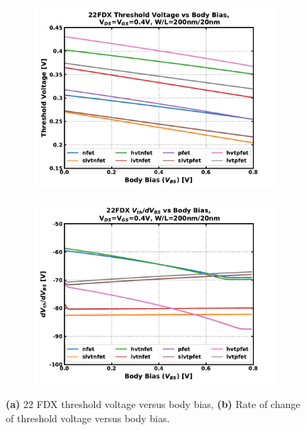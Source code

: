 		\begin{figure}[htb!]
		    \centering
		    \begin{subfigure}{0.5\textwidth}
		        \centering
		        \includegraphics[width=1\textwidth, angle=0]{./figs/design/vth_vbs}
		        \caption{ }
		        \label{fig:vth_vs_vbs}
		    \end{subfigure}%
		    \begin{subfigure}{0.5\textwidth}
		        \centering
		        \includegraphics[width=1\textwidth, angle=0]{./figs/design/vth_slope_vbs}
		        \caption{ }
		        \label{fig:vth_slope_vs_vbs}
		    \end{subfigure}
		    \caption{\textbf{(a)} 22 FDX threshold voltage versus body bias, \textbf{(b)} Rate of change of threshold voltage versus body bias.}
		    \label{fig:vth_groupa}
		\end{figure} 


